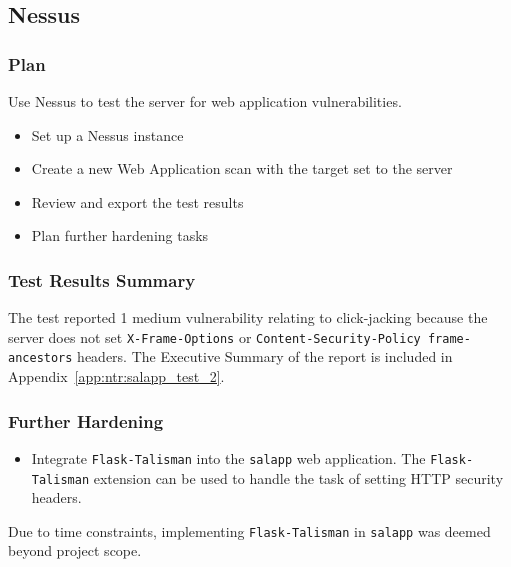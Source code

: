 \pagebreak
\subsection{Nessus}
\subsubsection*{Plan}
Use Nessus to test the server for web application vulnerabilities.
\begin{itemize}
  \item Set up a Nessus instance
  \item Create a new Web Application scan with the target set to the server
  \item Review and export the test results
  \item Plan further hardening tasks
\end{itemize}
\subsubsection*{Test Results Summary}
The test reported 1 medium vulnerability relating to click-jacking because the server does not set \texttt{X-Frame-Options} or \texttt{Content-Security-Policy frame-ancestors} headers. The Executive Summary of the report is included in Appendix~\ref{app:ntr:salapp_test_2}.
\subsubsection*{Further Hardening}
\begin{itemize}
  \item Integrate \texttt{Flask-Talisman} into the \texttt{salapp} web application. The \texttt{Flask-Talisman} extension can be used to handle the task of setting HTTP security headers.
\end{itemize}

\noindent\textcolor{deep-gray}{Due to time constraints, implementing \texttt{Flask-Talisman} in \texttt{salapp} was deemed beyond project scope.}

%
%
%
